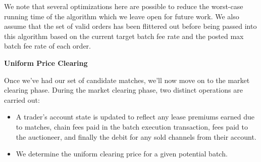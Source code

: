 \documentclass[10pt,a4paper]{article}
\theoremstyle{definition}
\begin{document}
We note that several optimizations here are possible to reduce the worst-case
running time of the algorithm which we leave open for future work. We also
assume that the set of valid orders has been flittered out before being passed
into this algorithm based on the current target batch fee rate and the posted
max batch fee rate of each order.

\begin{center}
    \textbf{Uniform Price Clearing}
\end{center}

Once we've had our set of candidate matches, we'll now move on to the market
clearing phase. During the market clearing phase, two distinct operations are
carried out:
\begin{itemize}
    \item A trader's account state is updated to reflect any lease premiums
        earned due to matches, chain fees paid in the  batch execution
        transaction, fees paid to the auctioneer, and finally the debit for any
        sold channels from their account.

    \item We determine the uniform clearing price for a given potential batch.
\end{itemize}
\end{document}
